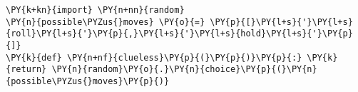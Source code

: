 \begin{Verbatim}[commandchars=\\\{\}]
\PY{k+kn}{import} \PY{n+nn}{random}
\PY{n}{possible\PYZus{}moves} \PY{o}{=} \PY{p}{[}\PY{l+s}{'}\PY{l+s}{roll}\PY{l+s}{'}\PY{p}{,}\PY{l+s}{'}\PY{l+s}{hold}\PY{l+s}{'}\PY{p}{]}
\PY{k}{def} \PY{n+nf}{clueless}\PY{p}{(}\PY{p}{)}\PY{p}{:} \PY{k}{return} \PY{n}{random}\PY{o}{.}\PY{n}{choice}\PY{p}{(}\PY{n}{possible\PYZus{}moves}\PY{p}{)}
\end{Verbatim}
